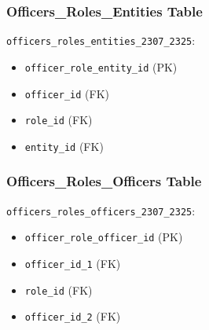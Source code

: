 \documentclass{article}
\begin{document}
\begin{minipage}{0.5\textwidth}
    \subsubsection*{Officers\_Roles\_Entities Table}
    \texttt{officers\_roles\_entities\_2307\_2325}:
    \begin{itemize}
        \item \texttt{officer\_role\_entity\_id} (PK)
        \item \texttt{officer\_id} (FK)
        \item \texttt{role\_id} (FK)
        \item \texttt{entity\_id} (FK)
    \end{itemize}

    \subsubsection*{Officers\_Roles\_Officers Table}
    \texttt{officers\_roles\_officers\_2307\_2325}:
    \begin{itemize}
        \item \texttt{officer\_role\_officer\_id} (PK)
        \item \texttt{officer\_id\_1} (FK)
        \item \texttt{role\_id} (FK)
        \item \texttt{officer\_id\_2} (FK)
    \end{itemize}

\end{minipage}
\hspace{0.05\textwidth}
\end{document}
